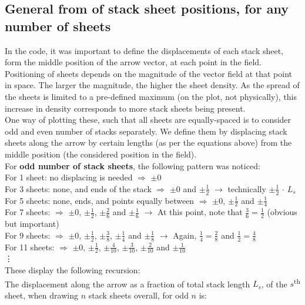 \documentclass[12pt]{report}
\begin{document}
\subsection{General from of stack sheet positions, for any number of sheets}

In the code, it was important to define the displacements of each stack sheet, form the middle position of the arrow vector, at each point in the field. Positioning of sheets depends on the magnitude of the vector field at that point in space. The larger the magnitude, the higher the sheet density. As the spread of the sheets is limited to a pre-defined maximum (on the plot, not physically), this increase in density corresponds to more stack sheets being present.\\
One way of plotting these, such that all sheets are equally-spaced is to consider odd and even number of stacks separately. We define them by displacing stack sheets along the arrow by certain lengths (as per the equations above) from the middle position (the considered position in the field).\\

\noindent For {\bf odd number of stack sheets}, the following pattern was noticed:\\
\small
For 1 sheet: no displacing is needed $\Rightarrow$ $\pm0$\\
For 3 sheets: none, and ends of the stack $\Rightarrow$ $\pm0$ and  $\pm\frac{1}{2}$ $\longrightarrow$ technically $\pm\frac{1}{2}$ $\cdot$ $L_s$\\
For 5 sheets: none, ends, and points equally between $\Rightarrow$ $\pm0$, $\pm\frac{1}{2}$ and $\pm\frac{1}{4}$\\
For 7 sheets: $\Rightarrow$ $\pm0$, $\pm\frac{1}{2}$, $\pm\frac{2}{6}$ and $\pm\frac{1}{6}$ $\longrightarrow$ At this point, note that $\frac{3}{6} = \frac{1}{2}$ (obvious but important)\\
For 9 sheets: $\Rightarrow$ $\pm0$, $\pm\frac{1}{2}$, $\pm\frac{3}{8}$, $\pm\frac{1}{4}$ and $\pm\frac{1}{8}$ $\longrightarrow$ Again, $\frac{1}{4} = \frac{2}{8}$ and $\frac{1}{2} = \frac{4}{8}$\\
For 11 sheets: $\Rightarrow$ $\pm0$, $\pm\frac{1}{2}$, $\pm\frac{4}{10}$, $\pm\frac{3}{10}$, $\pm\frac{2}{10}$  and $\pm\frac{1}{10}$\\
\vdots\\
\normalsize
\noindent These display the following recursion:\\
The displacement along the arrow as a fraction of total stack length $L_s$, of the $s$\textsuperscript{th} sheet, when drawing $n$ stack sheets overall, for odd $n$ is:
\end{document}
